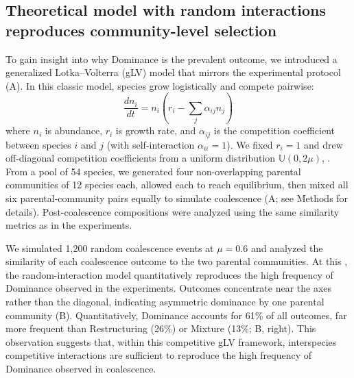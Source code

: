 \subsection{Theoretical model with random interactions reproduces community-level selection}
\label{sec:results:glv_model}
To gain insight into why Dominance is the prevalent outcome, we introduced a generalized Lotka--Volterra (gLV) model \citep{May1972, Grilli2017} that mirrors the experimental protocol (A). In this classic model, species grow logistically and compete pairwise:
\begin{equation}
\frac{dn_i}{dt} = n_i \left( r_i - \sum_j \alpha_{ij} n_j \right)
\label{eq:glv}
\end{equation}
where $n_i$ is abundance, $r_i$ is growth rate, and $\alpha_{ij}$ is the competition coefficient between species $i$ and $j$ (with self-interaction $\alpha_{ii} = 1$). We fixed $r_i = 1$ and drew off-diagonal competition coefficients from a uniform distribution $\mathbb{U}(0, 2\mu)$,  \citep{Hu2022,Hu2025}. From a pool of 54 species, we generated four non-overlapping parental communities of 12 species each, allowed each to reach equilibrium, then mixed all six parental-community pairs equally to simulate coalescence (A; see Methods for details). Post-coalescence compositions were analyzed using the same similarity metrics as in the experiments. 

We simulated 1,200 random coalescence events at  $\mu = 0.6$ and analyzed the similarity of each coalescence outcome to the two parental communities. At this , the random-interaction model quantitatively reproduces the high frequency of Dominance observed in the experiments. Outcomes concentrate near the axes rather than the diagonal, indicating asymmetric dominance by one parental community (B). Quantitatively, Dominance accounts for 61\% of all outcomes, far more frequent than Restructuring (26\%) or Mixture (13\%; B, right). This observation suggests that, within this competitive gLV framework, interspecies competitive interactions are sufficient to reproduce the high frequency of Dominance observed in coalescence.

